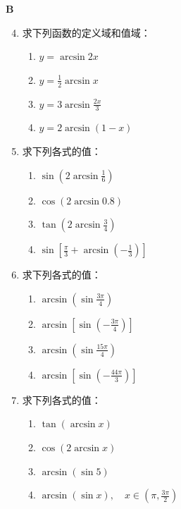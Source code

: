 \begin{center}
    \bfseries B
\end{center}
\begin{enumerate}\setcounter{enumi}{3}
    \item 求下列函数的定义域和值域：
\begin{multicols}{2}
\begin{enumerate}[(1)]
    \item $y=\arcsin 2x$
    \item $y=\frac{1}{2}\arcsin x$
    \item $y=3\arcsin \frac{2x}{3}$
    \item $y=2\arcsin (1-x)$
\end{enumerate}
\end{multicols}
    \item 求下列各式的值： 
\begin{multicols}{2}
\begin{enumerate}[(1)]
    \item $\sin\left(2\arcsin\frac{1}{6}\right)$
    \item $\cos(2\arcsin 0.8)$
    \item $\tan\left(2\arcsin\frac{3}{4}\right)$
    \item $\sin\left[\frac{\pi}{3}+\arcsin\left(-\frac{1}{3}\right)\right]$
\end{enumerate}
\end{multicols}
    \item 求下列各式的值： 
\begin{multicols}{2}
\begin{enumerate}[(1)]
    \item $\arcsin \left(\sin\frac{3\pi}{4}\right)$
    \item $\arcsin \left[\sin\left(-\frac{3\pi}{4}\right)\right]$
    \item $\arcsin \left(\sin\frac{15\pi}{4}\right)$
    \item $\arcsin \left[\sin\left(-\frac{44\pi}{3}\right)\right]$
\end{enumerate}
\end{multicols}
    \item 求下列各式的值： 
\begin{multicols}{2}
\begin{enumerate}[(1)]
    \item $\tan(\arcsin x)$
    \item $\cos(2\arcsin x)$
    \item $\arcsin (\sin 5)$
    \item $\arcsin(\sin x),\quad x\in\left(\pi,\frac{3\pi}{2}\right)$
\end{enumerate}
\end{multicols}
\end{enumerate}

